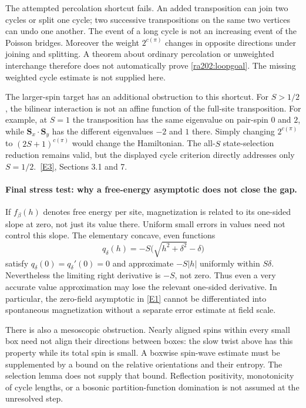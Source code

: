 \documentclass[11pt]{article}
\newcommand{\eref}[2]{\hyperlink{extra:#1:#2}{[E#2]}}
\begin{document}
	The attempted percolation shortcut fails. An added transposition can
	join two cycles or split one cycle; two successive transpositions on
	the same two vertices can undo one another. The event of a long cycle
	is not an increasing event of the Poisson bridges. Moreover the weight
	$2^{c(\pi)}$ changes in opposite directions under joining and splitting.
	A theorem about ordinary percolation or unweighted interchange therefore
	does not automatically prove \eqref{ra202:loopgoal}. The missing weighted
	cycle estimate is not supplied here.
	
	The larger-spin target has an additional obstruction to this shortcut.
	For $S>1/2$, the bilinear interaction is not an affine function of the
	full-site transposition. For example, at $S=1$ the transposition has
	the same eigenvalue on pair-spin $0$ and $2$, while
	$\mathbf S_x\cdot\mathbf S_y$ has the different eigenvalues $-2$ and
	$1$ there. Simply changing $2^{c(\pi)}$ to $(2S+1)^{c(\pi)}$ would
	change the Hamiltonian. The all-$S$ state-selection reduction remains
	valid, but the displayed cycle criterion directly addresses only
	$S=1/2$.\ \eref{202}{3}, Sections 3.1 and 7.
	
	\paragraph{Final stress test: why a free-energy asymptotic does not close the gap.}
	If $f_\beta(h)$ denotes free energy per site, magnetization is related
	to its one-sided slope at zero, not just its value there. Uniform
	small errors in values need not control this slope. The elementary
	concave, even functions
	\[
	q_\delta(h)=-S\bigl(\sqrt{h^2+\delta^2}-\delta\bigr)
	\]
	satisfy $q_\delta(0)=q_\delta'(0)=0$ and approximate $-S|h|$ uniformly
	within $S\delta$. Nevertheless the limiting right derivative is
	$-S$, not zero. Thus even a very accurate value approximation may
	lose the relevant one-sided derivative. In particular, the zero-field
	asymptotic in \eref{202}{1} cannot be differentiated into spontaneous
	magnetization without a separate error estimate at field scale.
	
	There is also a mesoscopic obstruction. Nearly aligned spins within
	every small box need not align their directions between boxes: the
	slow twist above has this property while its total spin is small.
	A boxwise spin-wave estimate must be supplemented by a bound on the
	relative orientations and their entropy. The selection lemma does
	not supply that bound. Reflection positivity, monotonicity of cycle
	lengths, or a bosonic partition-function domination is not assumed
	at the unresolved step.
	
\end{document}
